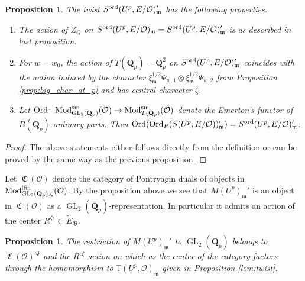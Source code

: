 \documentclass[leqno]{amsart}
\newtheorem{prop}[thm]{Proposition}
\theoremstyle{definition}
\theoremstyle{remark}
\newcommand{\oo}{\mathcal{O}}
\newcommand{\Qp}{\mathbf{Q}_p}
\DeclareMathOperator{\GL}{GL}
\newcommand{\fm}{\mathfrak{m}}
\DeclareMathOperator{\Mod}{\textnormal{Mod}}
\DeclareMathOperator{\fC}{\mathfrak{C}} %
\DeclareMathOperator{\Ord}{Ord} %
\newcommand{\B}{\mathfrak B} %
\newcommand{\sm}{\textnormal{sm}}
\newcommand{\lfin}{\textnormal{lfin}}
\newcommand{\TT}{\mathbb{T}} %
\newcommand{\ord}{\textnormal{ord}} %
\begin{document}
\begin{prop}\label{prop:twist_ord}
The twist $S^{\ord}(U^p,E/\oo)_\fm'$
has the following properties.
\begin{enumerate}
\item The action of $Z_Q$ on
$S^{\ord}(U^p,E/\oo)_\fm=S^{\ord}(U^p,E/\oo)_\fm'$
is as described in last proposition.

\item For $w=w_0$,
the action of $T(\Qp)=\Qp^2$ on $S^{\ord}(U^p,E/\oo)_\fm'$
coincides with the action induced by the character
$\xi_\fm^{1/2}\Psi_{w,1}\otimes \xi_\fm^{1/2}\Psi_{w,2}$
from Proposition \ref{prop:big_char_at_p}
and has central character $\zeta$.

\item 
Let $\Ord\colon \Mod^{\sm}_{\GL_2(\Qp)}(\oo)
\to \Mod^{\sm}_{T(\Qp)}(\oo)$ denote the Emerton's
functor of $B(\Qp)$-ordinary parts.
Then $\Ord(\Ord_P(S(U^p,E/\oo))_\fm')=S^{\ord}(U^p,E/\oo)_\fm'$.

\end{enumerate}
\end{prop}
\begin{proof}
The above statements either follows directly from 
the definition or can be proved by the same way
as the previous proposition.
\end{proof}

Let $\fC(\oo)$ denote the category of Pontryagin duals of objects in
$\Mod^{\lfin}_{\GL_2(\Qp),\zeta}(\oo)$.
By the proposition above we see that 
$M(U^p)_{\fm}'$ is an object in $\fC(\oo)$
as a $\GL_2(\Qp)$-representation.
In particular it admits an action of the center
$R^{\zeta\epsilon}\subset\tilde{E}_\B$.


\begin{prop}\label{prop:compatibility}
    The restriction of  $M(U^p)_{\fm}'$ to $\GL_2(\Qp)$
    belongs to $\fC(\oo)^{\B}$
	and the $R^{\epsilon\zeta}$-action on which
    as the center of the category
	factors through the homomorphism to $\TT(U^p,\oo)_\fm$
    given in Proposition \ref{lem:twist}.
\end{prop}
\end{document}
